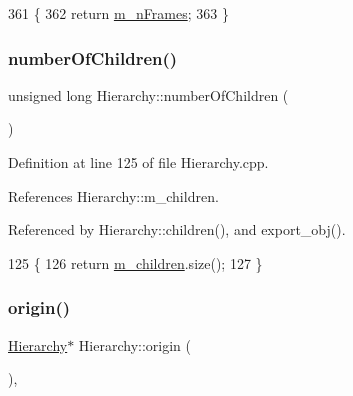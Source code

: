 \begin{DoxyCode}
361                       \{
362     \textcolor{keywordflow}{return} \hyperlink{classUsbFTMLInterface_ac7b9fb80fb8653a366c53ce3567cb823}{m\_nFrames};
363   \}
\end{DoxyCode}
\mbox{\label{classHierarchy_ab16e84de65fd84e14001a6cf941c8be4}} 
\subsubsection{\texorpdfstring{number\+Of\+Children()}{numberOfChildren()}}
{\footnotesize\ttfamily unsigned long Hierarchy\+::number\+Of\+Children (\begin{DoxyParamCaption}{ }\end{DoxyParamCaption})\hspace{0.3cm}{\ttfamily [inherited]}}



Definition at line 125 of file Hierarchy.\+cpp.



References Hierarchy\+::m\+\_\+children.



Referenced by Hierarchy\+::children(), and export\+\_\+obj().


\begin{DoxyCode}
125                                            \{
126   \textcolor{keywordflow}{return} \hyperlink{classHierarchy_a038816763941fd4a930504917f60483b}{m\_children}.size();
127 \}
\end{DoxyCode}
\mbox{\label{classHierarchy_aee461dc930ce3871636ff87f075b1b83}} 
\subsubsection{\texorpdfstring{origin()}{origin()}}
{\footnotesize\ttfamily \hyperlink{classHierarchy}{Hierarchy}$\ast$ Hierarchy\+::origin (\begin{DoxyParamCaption}{ }\end{DoxyParamCaption})\hspace{0.3cm}{\ttfamily [inline]}, {\ttfamily [inherited]}}




